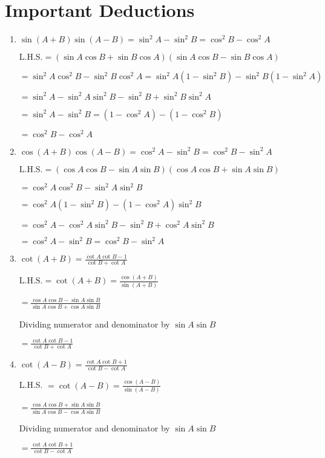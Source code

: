 \section{Important Deductions}
\begin{enumerate}
\item $\sin(A + B)\sin(A - B) = \sin^2A - \sin^2B = \cos^2B - \cos^2A$

$\text{L.H.S.}= (\sin A\cos B + \sin B\cos A)(\sin A\cos B - \sin B\cos A)$

  $= \sin^2A\cos^2B - \sin^2B\cos^2A = \sin^2A(1 - \sin^2B) - \sin^2B(1 - \sin^2A)$

  $= \sin^2A - \sin^2A\sin^2B - \sin^2B + \sin^2B\sin^2A$

  $=\sin^2A - \sin^2B = (1 - \cos^2A) - (1 - \cos^2B)$

  $= \cos^2B - \cos^2A$

\item $\cos(A + B)\cos(A - B) = \cos^2A - \sin^2B = \cos^2B - \sin^2A$

$\text{L.H.S.} =(\cos A\cos B - \sin A\sin B)(\cos A\cos B + \sin A\sin B)$

  $= \cos^2A\cos^2B - \sin^2A\sin^2B$

  $= \cos^2A(1- \sin^2B) - (1 - \cos^2A)\sin^2B$

  $=\cos^2A - \cos^2A\sin^2B - \sin^2B + \cos^2A\sin^2B$

  $= \cos^2A - \sin^2B = \cos^2B - \sin^2A$

\item $\cot(A + B) = \frac{\cot A\cot B - 1}{\cot B + \cot A}$

  $\text{L.H.S.} = \cot(A + B) = \frac{\cos(A + B)}{\sin(A + B)}$

  $= \frac{\cos A\cos B - \sin A\sin B}{\sin A\cos B + \cos A\sin B}$

  Dividing numerator and denominator by $\sin A\sin B$

  $= \frac{\cot A\cot B - 1}{\cot B + \cot A}$

\item $\cot(A - B) = \frac{\cot A\cot B + 1}{\cot B - \cot A}$

  L.H.S. $= \cot(A - B) = \frac{\cos(A - B)}{\sin(A - B)}$

  $= \frac{\cos A\cos B + \sin A\sin B}{\sin A\cos B - \cos A\sin B}$

  Dividing numerator and denominator by $\sin A\sin B$

  $= \frac{\cot A\cot B + 1}{\cot B - \cot A}$


\end{enumerate}
